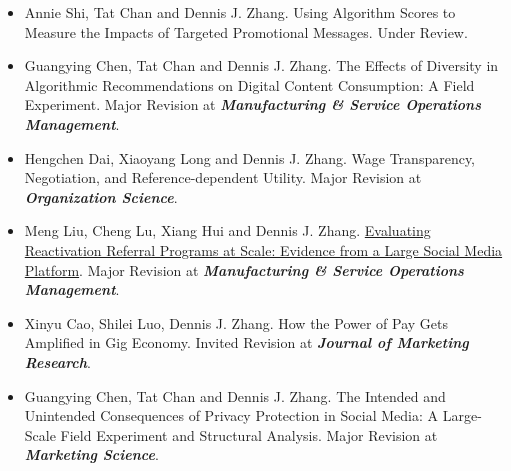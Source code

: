 \documentclass[10pt]{article}
\renewcommand{\section}[1]{\pagebreak[3]%
    \hyphenpenalty=10000%
    \vspace{1.3\baselineskip}%
    \phantomsection\addcontentsline{toc}{section}{#1}%
    \noindent\llap{\scshape\smash{\parbox[t]{\marginparwidth}{\raggedright #1}}}%
    \vspace{-\baselineskip}\par}
\begin{document}
\begin{itemize}
    \item Annie Shi, Tat Chan and Dennis J. Zhang. Using Algorithm Scores to Measure the Impacts of Targeted Promotional Messages. Under Review.

    \item Guangying Chen, Tat Chan and Dennis J. Zhang. The Effects of Diversity in Algorithmic Recommendations on Digital Content Consumption: A Field Experiment. Major Revision at \emph{\bf Manufacturing \& Service Operations Management}.

    \item Hengchen Dai, Xiaoyang Long and Dennis J. Zhang. Wage Transparency, Negotiation, and Reference-dependent Utility. Major Revision at \emph{\bf Organization Science}.

    \item Meng Liu, Cheng Lu, Xiang Hui and Dennis J. Zhang. \href{https://papers.ssrn.com/sol3/papers.cfm?abstract_id=5086150}{Evaluating Reactivation Referral Programs at Scale: Evidence from a Large Social Media Platform}. Major Revision at \emph{\bf Manufacturing \& Service Operations Management}.

    \item Xinyu Cao, Shilei Luo, Dennis J. Zhang. How the Power of Pay Gets Amplified in Gig Economy. Invited Revision at \emph {\bf Journal of Marketing Research}.

    \item Guangying Chen, Tat Chan and Dennis J. Zhang. The Intended and Unintended Consequences of Privacy Protection in Social Media: A Large-Scale Field Experiment and Structural Analysis. Major Revision at \emph{\bf Marketing Science}.


\end{itemize}






 
\end{document}
